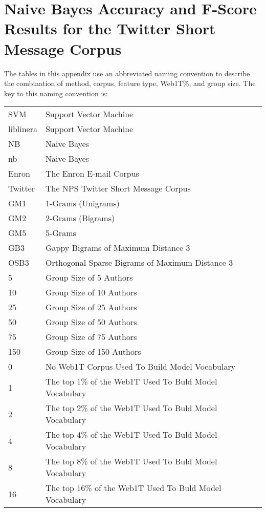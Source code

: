 \chapter{Naive Bayes Accuracy and F-Score Results for the Twitter Short Message Corpus}

The tables in this appendix use an abbreviated naming convention to describe the combination of method, corpus, feature type, Web1T\%, and group size.  The key to this naming convention is:

\begin{center}
\begin{table}[htbp!]
	\begin{center}
	\begin{tabular}{ll}
	SVM & Support Vector Machine\\
	liblinera & Support Vector Machine\\
	NB & Naive Bayes\\
	nb & Naive Bayes\\
	
	Enron & The Enron E-mail Corpus\\
	Twitter & The NPS Twitter Short Message Corpus\\
	
	GM1 & 1-Grams (Unigrams)\\
	GM2 & 2-Grams (Bigrams)\\
	GM5 & 5-Grams\\
	GB3 & Gappy Bigrams of Maximum Distance 3\\
	OSB3 & Orthogonal Sparse Bigrams of Maximum Distance 3\\
		
	5 & Group Size of 5 Authors\\
	10 & Group Size of 10 Authors\\
	25 & Group Size of 25 Authors\\
	50 & Group Size of 50 Authors\\
	75 & Group Size of 75 Authors\\
	150 & Group Size of 150 Authors\\
	
	0 & No Web1T Corpus Used To Build Model Vocabulary\\
	1 & The top 1\% of the Web1T Used To Buld Model Vocabulary\\
	2 & The top 2\% of the Web1T Used To Buld Model Vocabulary\\
	4 & The top 4\% of the Web1T Used To Buld Model Vocabulary\\
	8 & The top 8\% of the Web1T Used To Buld Model Vocabulary\\
	16 & The top 16\% of the Web1T Used To Buld Model Vocabulary\\
	\end{tabular}
	\end{center}
\end{table}
\end{center}


